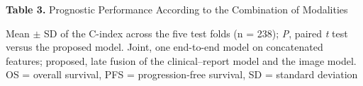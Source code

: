 \documentclass[border=8pt]{standalone}
\newif\ifshowtitle \showtitletrue
\newif\ifshownotes \shownotestrue
\begin{document}
\sbox{}%
\begin{minipage}{\wd\tablebox}
\ifshowtitle\noindent \textbf{Table 3.} Prognostic Performance According to the Combination of Modalities\par\vspace{4pt}\fi
\noindent\usebox\tablebox
\ifshownotes\par\vspace{3pt}\footnotesize\noindent Mean $\pm$ SD of the C-index across the five test folds (n = 238); \textit{P}, paired \textit{t} test versus the proposed model. Joint, one end-to-end model on concatenated features; proposed, late fusion of the clinical--report model and the image model. OS = overall survival, PFS = progression-free survival, SD = standard deviation\par\fi
\end{minipage}
\end{document}

